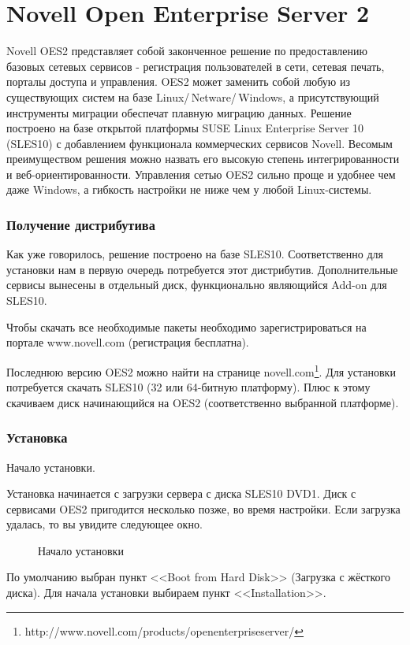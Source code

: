 \part{Novell Open Enterprise Server 2}
Novell OES2 представляет собой законченное решение по предоставлению базовых сетевых сервисов - регистрация пользователей в сети, сетевая печать, порталы доступа и управления. OES2 может заменить собой любую из существующих систем на базе Linux/\,Netware/\,Windows, а присутствующий инструменты миграции обеспечат плавную миграцию данных. Решение построено на базе открытой платформы SUSE Linux Enterprise Server 10 (SLES10) с добавлением функционала коммерческих сервисов Novell. Весомым преимуществом решения можно назвать его высокую степень интегрированности и веб-ориентированности. Управления сетью OES2 сильно проще и удобнее чем даже Windows, а гибкость настройки не ниже чем у любой Linux-системы.

\section{Получение дистрибутива}
Как уже говорилось, решение построено на базе SLES10. Соответственно для установки нам в первую очередь потребуется этот дистрибутив. Дополнительные сервисы вынесены в отдельный диск, функционально являющийся Add-on для SLES10.\par
Чтобы скачать все необходимые пакеты необходимо зарегистрироваться на портале www.novell.com (регистрация бесплатна).\par
Последнюю версию OES2 можно найти на странице novell.com\footnote{http://www.novell.com/products/openenterpriseserver/}. Для установки потребуется скачать SLES10 (32 или 64-битную платформу). Плюс к этому скачиваем диск начинающийся на OES2 (соответственно выбранной платформе).
\clearpage

\section{Установка}
Начало установки.\par
Установка начинается с загрузки сервера с диска SLES10 DVD1. Диск с сервисами OES2 пригодится несколько позже, во время настройки. Если загрузка удалась, то вы увидите следующее окно.
\begin{figure}[H]
\caption{Начало установки}
\label{fig1}
\end{figure}
По умолчанию выбран пункт <<Boot from Hard Disk>> (Загрузка с жёсткого диска). Для начала установки выбираем пункт <<Installation>>.
\clearpage

